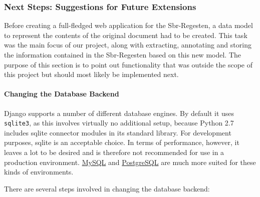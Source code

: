 \subsubsection{Next Steps: Suggestions for Future Extensions}
\label{sec:next}

Before creating a full-fledged web application for the Sbr-Regesten, a
data model to represent the contents of the original document had to
be created. This task was the main focus of our project, along with
extracting, annotating and storing the information contained in the
Sbr-Regesten based on this new model. The purpose of this section is
to point out functionality that was outside the scope of this project
but should most likely be implemented next.

\paragraph{Changing the Database Backend}

Django supports a number of different database engines. By default it
uses \texttt{sqlite3}, as this involves virtually no additional setup,
because Python 2.7 includes sqlite connector modules in its standard
library. For development purposes, sqlite is an acceptable choice. In
terms of performance, however, it leaves a lot to be desired and is
therefore not recommended for use in a production environment.
\href{http://www.mysql.com/}{MySQL} and
\href{http://www.postgresql.org/}{PostgreSQL} are much more suited for
these kinds of environments.

There are several steps involved in changing the database backend:

